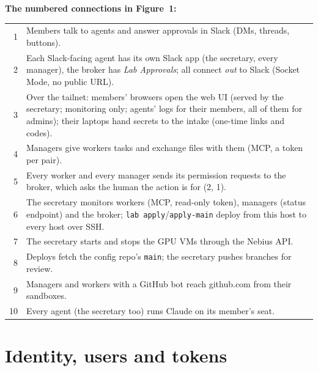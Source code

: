 \documentclass[11pt]{article}
\newcommand{\code}[1]{\texttt{#1}}
\begin{document}
\noindent\textbf{The numbered connections in Figure~1:}\par
\small
\begin{tabularx}{\linewidth}{rL}
1 & Members talk to agents and answer approvals in Slack (DMs, threads, buttons). \\
2 & Each Slack-facing agent has its own Slack app (the secretary, every manager), the broker
    has \emph{Lab Approvals}; all connect \emph{out} to Slack (Socket Mode, no public URL). \\
3 & Over the tailnet: members' browsers open the web UI (served by the secretary;
    monitoring only; agents' logs for their members, all of them for admins); their laptops hand secrets to the
    intake (one-time links and codes). \\
4 & Managers give workers tasks and exchange files with them (MCP, a token per pair). \\
5 & Every worker and every manager sends its permission requests to the broker, which asks
    the human the action is for (2, 1). \\
6 & The secretary monitors workers (MCP, read-only token), managers (status endpoint) and the
    broker; \code{lab apply}/\code{apply-main} deploy from this host to every host over SSH. \\
7 & The secretary starts and stops the GPU VMs through the Nebius API. \\
8 & Deploys fetch the config repo's \code{main}; the secretary pushes branches for review. \\
9 & Managers and workers with a GitHub bot reach github.com from their sandboxes. \\
10 & Every agent (the secretary too) runs Claude on its member's seat. \\
\end{tabularx}
\normalsize


\section{Identity, users and tokens}
\end{document}
